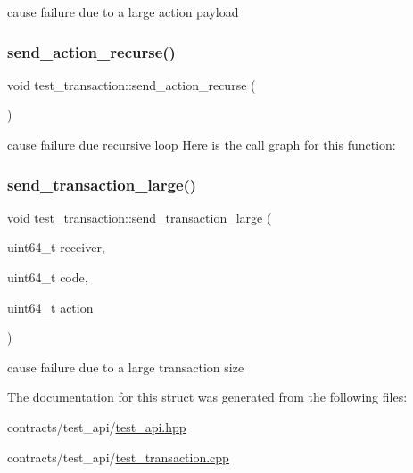 cause failure due to a large action payload \mbox{\label{structtest__transaction_adb0f06a5ff3200e418e9d8a622cc27e2}} 
\subsubsection{\texorpdfstring{send\+\_\+action\+\_\+recurse()}{send\_action\_recurse()}}
{\footnotesize\ttfamily void test\+\_\+transaction\+::send\+\_\+action\+\_\+recurse (\begin{DoxyParamCaption}{ }\end{DoxyParamCaption})\hspace{0.3cm}{\ttfamily [static]}}

cause failure due recursive loop Here is the call graph for this function\+:
\mbox{\label{structtest__transaction_ab7633912e3a2c483ab0a6bfc987789a0}} 
\subsubsection{\texorpdfstring{send\+\_\+transaction\+\_\+large()}{send\_transaction\_large()}}
{\footnotesize\ttfamily void test\+\_\+transaction\+::send\+\_\+transaction\+\_\+large (\begin{DoxyParamCaption}\item[{uint64\+\_\+t}]{receiver,  }\item[{uint64\+\_\+t}]{code,  }\item[{uint64\+\_\+t}]{action }\end{DoxyParamCaption})\hspace{0.3cm}{\ttfamily [static]}}

cause failure due to a large transaction size 

The documentation for this struct was generated from the following files\+:\begin{DoxyCompactItemize}
\item 
contracts/test\+\_\+api/\mbox{\hyperlink{test__api_8hpp}{test\+\_\+api.\+hpp}}\item 
contracts/test\+\_\+api/\mbox{\hyperlink{test__transaction_8cpp}{test\+\_\+transaction.\+cpp}}\end{DoxyCompactItemize}
